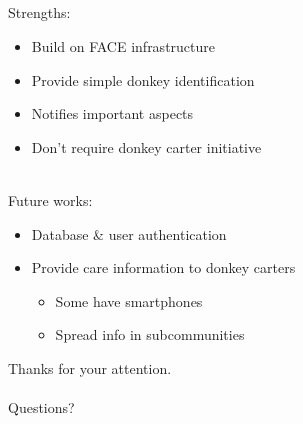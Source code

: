 \documentclass{beamer}
\begin{document}
\subsection{}

\begin{frame}
Strengths:
\begin{itemize}
 \item Build on FACE infrastructure
 \pause
 \item Provide simple donkey identification
 \pause
 \item Notifies important aspects
 \pause
 \item Don't require donkey carter initiative
\end{itemize}
~\\
\pause
Future works:
\begin{itemize}
 \item Database \& user authentication
 \pause
 \item Provide care information to donkey carters
 \begin{itemize}
  \item Some have smartphones
  \item Spread info in subcommunities
 \end{itemize}
\end{itemize}
\end{frame}

\begin{frame}
\begin{center}
Thanks for your attention.\\
~\\
Questions?\\
\end{center}
\end{frame}

\appendix
{}
\setcounter{finalframe}{\value{framenumber}}

% 
% 

\setcounter{framenumber}{\value{finalframe}}
\end{document}

